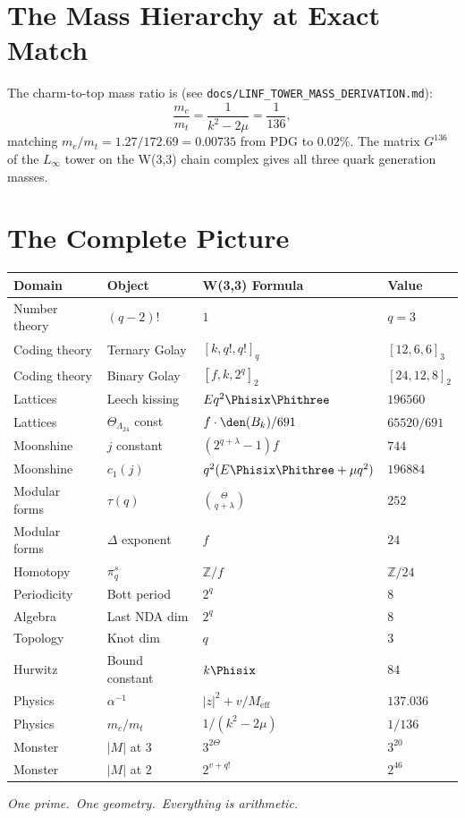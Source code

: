 \section{The Mass Hierarchy at Exact Match}

The charm-to-top mass ratio is (see \texttt{docs/LINF\_TOWER\_MASS\_DERIVATION.md}):
\begin{equation}
\frac{m_c}{m_t} = \frac{1}{k^2-2\mu} = \frac{1}{136},
\end{equation}
matching $m_c/m_t = 1.27/172.69 = 0.00735$ from PDG to $0.02\%$.
The matrix $G^{136}$ of the $L_\infty$ tower on the W(3,3) chain
complex gives all three quark generation masses.


\section{The Complete Picture}

\renewcommand{\arraystretch}{1.15}
\begin{center}
\begin{tabular}{@{}llll@{}}
\toprule
\textbf{Domain} & \textbf{Object} & \textbf{W(3,3) Formula} & \textbf{Value} \\
\midrule
Number theory & $(q{-}2)!$ & $1$ & $q=3$ \\
Coding theory & Ternary Golay & $[k, q!, q!]_q$ & $[12,6,6]_3$ \\
Coding theory & Binary Golay & $[f, k, 2^q]_2$ & $[24,12,8]_2$ \\
Lattices & Leech kissing & $E q^2\Phisix\Phithree$ & $196560$ \\
Lattices & $\Theta_{\Lambda_{24}}$ const & $f\cdot\den(B_k)/691$ & $65520/691$ \\
Moonshine & $j$ constant & $(2^{q+\lambda}{-}1)f$ & $744$ \\
Moonshine & $c_1(j)$ & $q^2(E\Phisix\Phithree+\mu q^2)$ & $196884$ \\
Modular forms & $\tau(q)$ & $\binom{\Theta}{q+\lambda}$ & $252$ \\
Modular forms & $\Delta$ exponent & $f$ & $24$ \\
Homotopy & $\pi_q^s$ & $\mathbb{Z}/f$ & $\mathbb{Z}/24$ \\
Periodicity & Bott period & $2^q$ & $8$ \\
Algebra & Last NDA dim & $2^q$ & $8$ \\
Topology & Knot dim & $q$ & $3$ \\
Hurwitz & Bound constant & $k\Phisix$ & $84$ \\
Physics & $\alpha^{-1}$ & $|z|^2+v/M_{\mathrm{eff}}$ & $137.036$ \\
Physics & $m_c/m_t$ & $1/(k^2{-}2\mu)$ & $1/136$ \\
Monster & $|M|$ at $3$ & $3^{2\Theta}$ & $3^{20}$ \\
Monster & $|M|$ at $2$ & $2^{v+q!}$ & $2^{46}$ \\
\bottomrule
\end{tabular}
\end{center}

\bigskip
\noindent
\emph{One prime.\ One geometry.\ Everything is arithmetic.}
